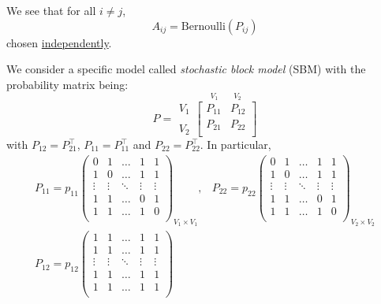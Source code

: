 We see that for all \(i\neq j\),
\[
	A_{ij} = \mathrm{Bernoulli}(P_{ij})
\]
chosen \hyperref[def:independent]{independently}.

\begin{eg}
	We consider a specific model called \emph{stochastic block model} (SBM) with the probability matrix being:
	\[
		P = \substack{V_1 \\ \\ V_2}\overset{V_1\qquad V_2}{\begin{bmatrix}
				P_{11} & P_{12} \\
				P_{21} & P_{22} \\
			\end{bmatrix}}
	\]
	with \(P_{12} = P_{21}^{\top}\), \(P_{11} = P_{11}^{\top}\) and \(P_{22} = P_{22}^{\top}\). In particular,
	\[
		\begin{split}
			P_{11} = p_{11}\begin{pmatrix}
				0      & 1      & \ldots & 1      & 1      \\
				1      & 0      & \ldots & 1      & 1      \\
				\vdots & \vdots & \ddots & \vdots & \vdots \\
				1      & 1      & \ldots & 0      & 1      \\
				1      & 1      & \ldots & 1      & 0      \\
			\end{pmatrix}_{V_1 \times V_1}, &
			P_{22} = p_{22}\begin{pmatrix}
				0      & 1      & \ldots & 1      & 1      \\
				1      & 0      & \ldots & 1      & 1      \\
				\vdots & \vdots & \ddots & \vdots & \vdots \\
				1      & 1      & \ldots & 0      & 1      \\
				1      & 1      & \ldots & 1      & 0      \\
			\end{pmatrix}_{V_2 \times V_2}\\
			P_{12} = p_{12}\begin{pmatrix}
				1      & 1      & \ldots & 1      & 1      \\
				1      & 1      & \ldots & 1      & 1      \\
				\vdots & \vdots & \ddots & \vdots & \vdots \\
				1      & 1      & \ldots & 1      & 1      \\
				1      & 1      & \ldots & 1      & 1      \\

\end{pmatrix}
\end{split}\]
\end{eg}
